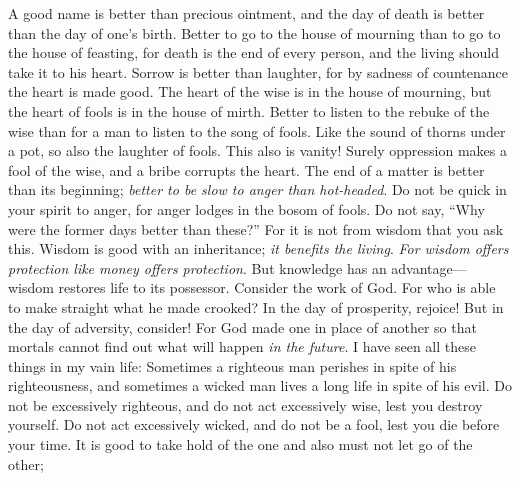 \begin{biblechapter} %
 A good name is better than precious ointment, 
and the day of death is better than the day of one’s birth.
\verse Better to go to the house of mourning 
than to go to the house of feasting, 
for death is the end of every person, 
and the living should take it to his heart.
\verse Sorrow is better than laughter, 
for by sadness of countenance the heart is made good.
\verse The heart of the wise is in the house of mourning, 
but the heart of fools is in the house of mirth.
\verse Better to listen to the rebuke of the wise 
than for a man to listen to the song of fools.
\verse Like the sound of thorns under a pot, 
so also the laughter of fools. 
This also is vanity!
 Surely oppression makes a fool of the wise, 
and a bribe corrupts the heart.
\verse The end of a matter is better than its beginning; 
\textit{better to be slow to anger than hot-headed}.
\verse Do not be quick in your spirit to anger, 
for anger lodges in the bosom of fools.
\verse Do not say, “Why were the former days better than these?” 
For it is not from wisdom that you ask this.
\verse Wisdom is good with an inheritance; 
\textit{it benefits the living}.
\verse \textit{For wisdom offers protection like money offers protection}. 
But knowledge has an advantage—wisdom restores life to its possessor.
 Consider the work of God. 
For who is able to make straight what he made crooked?
\verse In the day of prosperity, rejoice! 
But in the day of adversity, consider! 
For God made one in place of another 
so that mortals cannot find out what will happen \textit{in the future}.
 I have seen all these things in my vain life: 
Sometimes a righteous man perishes in spite of his righteousness, 
and sometimes a wicked man lives a long life in spite of his evil.
\verse Do not be excessively righteous, 
and do not act excessively wise, lest you destroy yourself.
\verse Do not act excessively wicked, 
and do not be a fool, lest you die before your time.
\verse It is good to take hold of the one and also must not let go of the other; 

\end{biblechapter}

